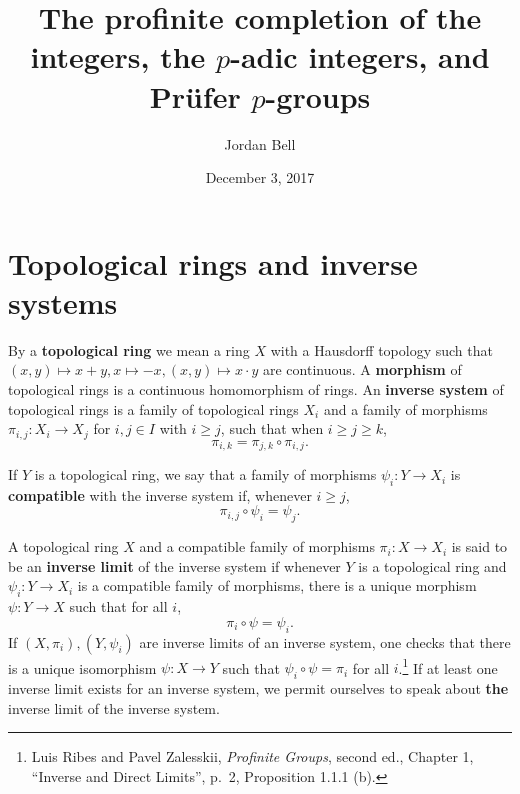 \documentclass{article}
\theoremstyle{definition}
\begin{document}
\title{The profinite completion of the integers, the $p$-adic integers, and Pr\"ufer $p$-groups}
\author{Jordan Bell}
\date{December 3, 2017}

\maketitle

\section{Topological rings and inverse systems}
By a \textbf{topological ring} we mean a ring $X$ with a Hausdorff topology such that $(x,y) \mapsto x+y, x \mapsto -x, (x,y) \mapsto x\cdot y$ 
are continuous. A \textbf{morphism} of topological rings is a continuous homomorphism of rings. 
An \textbf{inverse system} of topological rings is a family of topological rings
$X_i$ and a family of morphisms $\pi_{i,j}:X_i \to X_j$ for $i,j \in I$ with $i \geq j$, such that when $i \geq j \geq k$,
\[
\pi_{i,k} = \pi_{j,k} \circ \pi_{i,j}.
\]

If $Y$ is a topological ring,
we say that a family of morphisms $\psi_i:Y \to X_i$ is \textbf{compatible} with the inverse system if, whenever $i \geq j$,
\[
\pi_{i,j} \circ \psi_i = \psi_j.
\]

A topological ring $X$ and a compatible family of morphisms $\pi_i:X \to X_i$ is said to be an \textbf{inverse limit} of the inverse system
if whenever $Y$ is a topological ring and $\psi_i:Y \to X_i$ is a compatible family of morphisms, there is a unique 
morphism $\psi:Y \to X$ such that for all $i$,
\[
\pi_i \circ \psi = \psi_i.
\]
If $(X,\pi_i),(Y,\psi_i)$ are inverse limits of an inverse system, 
one checks that there is a unique isomorphism $\psi:X \to Y$ such that $\psi_i \circ \psi = \pi_i$ for all $i$.\footnote{Luis Ribes and Pavel Zalesskii, {\em Profinite Groups}, second ed., Chapter 1, ``Inverse and Direct Limits'', p.~2, Proposition 1.1.1 (b).}
If at least one inverse limit exists for an inverse system,
we
permit ourselves to speak about \textbf{the} inverse limit of the inverse system.
\end{document}
